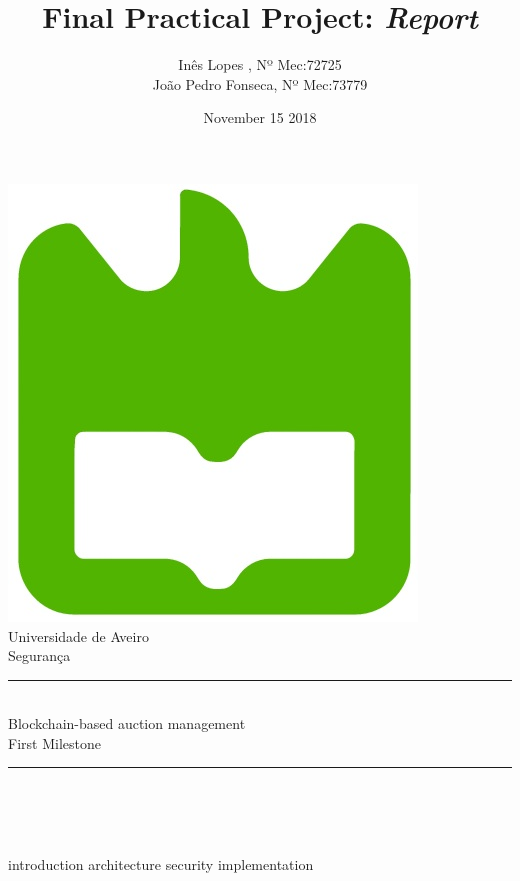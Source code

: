 \documentclass[11pt,a4paper]{report}
\title{Final Practical Project: \textit{Report}}
\author{Inês Lopes , Nº Mec:72725\\João Pedro Fonseca, Nº Mec:73779}
\date{November 15 2018}
\begin{document}
\setcounter{secnumdepth}{4}
\vspace*{\fill}
\begin{center}
\includegraphics[scale = 0.25]{LogoUA.jpg}\\[1cm]
\Large Universidade de Aveiro
\\[1.5cm]
\Large Segurança
\\[1.5cm]


\noindent\rule{12.5cm}{0.01pt}
\\[0.3cm]
{\huge{Blockchain-based auction management}\\ First Milestone}
\\[0.2cm]
\noindent\rule{12.5cm}{0.01pt}
\\[1.5cm]
\makeatletter
\@author\space
\\[0.3cm]
\@date
\makeatother
\\[3cm]

\end{center}
\vspace*{\fill}

\newpage

\tableofcontents

\newcommand*{\sectiondir}{sections/}


{introduction}
{architecture}
{security}
{implementation}


\nocite{*}

\end{document}
